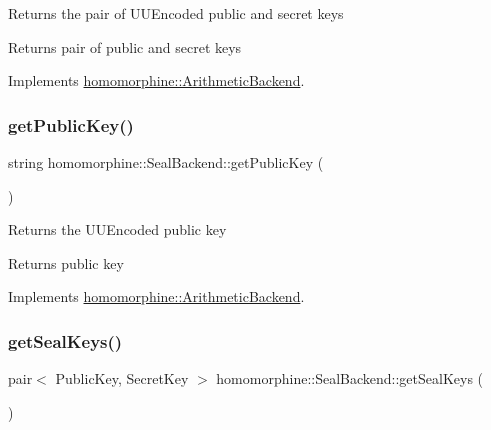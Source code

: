 Returns the pair of U\+U\+Encoded public and secret keys

\begin{DoxyReturn}{Returns}
pair of public and secret keys 
\end{DoxyReturn}


Implements \mbox{\hyperlink{classhomomorphine_1_1_arithmetic_backend_a71bb86054685708001c636e3085d578c}{homomorphine\+::\+Arithmetic\+Backend}}.

\mbox{\label{classhomomorphine_1_1_seal_backend_aa2dce269303eaa73c62dbfacce66dc1a}} 
\subsubsection{\texorpdfstring{getPublicKey()}{getPublicKey()}}
{\footnotesize\ttfamily string homomorphine\+::\+Seal\+Backend\+::get\+Public\+Key (\begin{DoxyParamCaption}{ }\end{DoxyParamCaption})\hspace{0.3cm}{\ttfamily [virtual]}}

Returns the U\+U\+Encoded public key

\begin{DoxyReturn}{Returns}
public key 
\end{DoxyReturn}


Implements \mbox{\hyperlink{classhomomorphine_1_1_arithmetic_backend_a26f31fc0c76cf58636972f68142b9a06}{homomorphine\+::\+Arithmetic\+Backend}}.

\mbox{\label{classhomomorphine_1_1_seal_backend_af12f7bbba973928bd2944b837f4202c4}} 
\subsubsection{\texorpdfstring{getSealKeys()}{getSealKeys()}}
{\footnotesize\ttfamily pair$<$ Public\+Key, Secret\+Key $>$ homomorphine\+::\+Seal\+Backend\+::get\+Seal\+Keys (\begin{DoxyParamCaption}{ }\end{DoxyParamCaption})}

